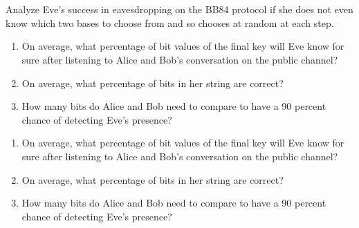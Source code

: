 \section{}

Analyze Eve's success in eavesdropping on the BB84 protocol if she does not even know
which two bases to choose from and so chooses at random at each step.
\begin{enumerate}[label=\alph*.,ref={Ex.~\thesection\alph*}]
    \item On average, what percentage of bit values of the final key will Eve know for sure
    after listening to Alice and Bob's conversation on the public channel?
    \item On average, what percentage of bits in her string are correct?
    \item How many bits do Alice and Bob need to compare to have a 90 percent chance of detecting
    Eve's presence?
\end{enumerate}
\vspace{0.5em}
{\Sol}
\vspace{-1.5em}
\begin{enumerate}[label=\alph*.,ref={Ex.~\thesection\alph*}]
    \item On average, what percentage of bit values of the final key will Eve know for sure
    after listening to Alice and Bob's conversation on the public channel?
    \item On average, what percentage of bits in her string are correct?
    \item How many bits do Alice and Bob need to compare to have a 90 percent chance of detecting
    Eve's presence?
\end{enumerate}
